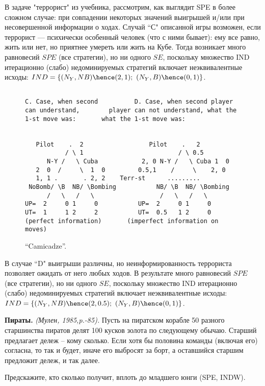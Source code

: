 \documentclass[a4paper,12pt]{article}
\begin{document}
\begin{exmp}{\rm В задаче "террорист" из учебника,
рассмотрим, как выглядит SPE в более сложном случае: при
совпадении некоторых значений выигрышей и/или при
несовершенной информации о ходах. Случай ``С" описанной
игры возможен, если террорист — психически особенный
человек (что с ними бывает): ему все равно, жить или нет,
но приятнее умереть или жить на Кубе. Тогда возникает много
равновесий $SPE$ (все стратегии), но ни одного $SE$,
поскольку множество IND итерационно (слабо) недоминируемых
стратегий включает неэквивалентные исходы: $IND=\{
(N_Y,NB)\hence (2,1);~ (N_Y,B)\hence (0,1)\}$.

\begin{figure}[h]
\begin{verbatim}

C. Case, when second          D. Case, when second player
can understand,        player can not understand, what the
1-st move was:       what the 1-st move was:


   Pilot    .  2                  Pilot    .   2
           / \ 1                          / \ 0.5
      N-Y /   \ Cuba            2, 0 N-Y /   \ Cuba 1  0
   2  0  /     \  1  0         0.5,1    /     \    2, 0
   1, 1 .       . 2, 2    Terr-st      .........
 NoBomb/ \B  NB/ \Bombing           NB/ \B  NB/ \Bombing
      /   \   /   \                  /   \   /   \
UP=  2     0 1     0           UP=  2     0 1     0
UT=  1     1 2     2           UT=  0.5   1 2     0
(perfect information)       (imperfect information on moves)
\end{verbatim}\caption{``Camicadze''.}
\end{figure}

В случае ``D" выигрыши различны, но неинформированность
террориста позволяет ожидать от него любых ходов. В
результате много равновесий $SPE$ (все стратегии), но ни
одного $SE$, поскольку множество IND итерационно (слабо)
недоминируемых стратегий включает неэквивалентные исходы:
$IND=\{ (N_Y,NB)\hence (2,0.5);~ (N_Y,B)\hence (0,1)\}$.
}\end{exmp}

\begin{exmp}\rm
{\bf Пираты.} {\em (Мулен, 1985,p.-85).} Пусть на пиратском
корабле 50 разного старшинства пиратов делят 100 кусков
золота по следующему обычаю. Старший предлагает дележ --
кому сколько. Если хотя бы половина команды (включая его)
согласна, то так и будет, иначе его выбросят за борт, а
оставшийся старшим предложит дележ, и так далее.

Предскажите, кто сколько получит, вплоть до младшего юнги
(SPE, INDW).
\end{exmp}
\end{document}
